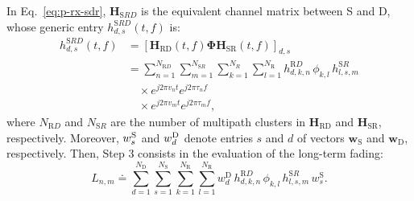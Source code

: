 \begin{enumerate}
In Eq.~\eqref{eq:p-rx-sdr}, $\bm{H}_{\mathrm SRD}$ is the equivalent channel matrix between S and D, whose generic entry $h^{\mathrm SRD}_{d, s} (t, f)$ is:
\begin{equation}
\begin{aligned}
\label{eq:psd_relay_sums}
h^{\mathrm SRD}_{d, s} (t, f) &= \left[ \bm{H}_{\textrm {RD}} (t, f) \bm{\Phi} \bm{H}_{\textrm {SR}} (t, f) \right]_{d, s} \\
& = \sum_{n=1}^{N_{\mathrm RD}} \sum_{m=1}^{N_{\mathrm SR}} \sum_{k=1}^{N_{R}} \sum_{l=1}^{N_{\mathrm R}} h^{\mathrm RD}_{d, k, n} \, \phi_{k, l} \, h^{\mathrm SR}_{l, s, m} \\
& \quad \times e^{j 2 \pi v_{n} t} e^{j 2 \pi \tau_{n} f} \\
& \quad \times e^{j 2 \pi v_{m} t} e^{j 2 \pi \tau_{m} f},
\end{aligned}
\end{equation}
where $N_{\mathrm RD}$ and $N_{\mathrm SR}$ are the number of multipath clusters in $\bm{H}_{\textrm {RD}}$ and $\bm{H}_{\textrm {SR}}$, respectively. Moreover, $w^{\textrm S}_{s}$ and $w^{\textrm D}_{d}$ denote entries $s$ and $d$ of vectors $\bm{w}_{\mathrm S}$ and $\bm{w}_{\mathrm D}$, respectively.
Then, Step 3 consists in the evaluation of the long-term fading:
\begin{equation}
L_{n, m} \doteq \sum_{d=1}^{N_{\mathrm D}} \sum_{s=1}^{N_{\mathrm S}} \sum_{k=1}^{N_{\mathrm R}} \sum_{l=1}^{N_{\mathrm R}} w^{\mathrm D}_{d} \, h^{\mathrm RD}_{d, k, n} \, \phi_{k, l} \, h^{\mathrm SR}_{l, s, m} \, w^{\mathrm S}_{s}. 
\end{equation}


\end{enumerate}
